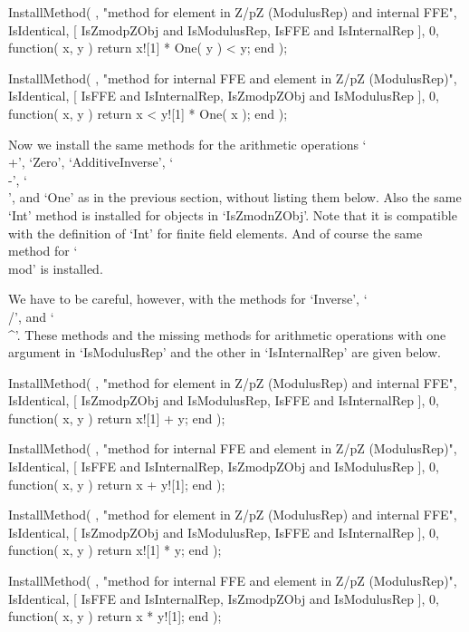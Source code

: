     InstallMethod( \<,
        "method for element in Z/pZ (ModulusRep) and internal FFE",
        IsIdentical,
        [ IsZmodpZObj and IsModulusRep, IsFFE and IsInternalRep ], 0,
        function( x, y )
        return x![1] * One( y ) < y;
        end );

    InstallMethod( \<,
        "method for internal FFE and element in Z/pZ (ModulusRep)",
        IsIdentical,
        [ IsFFE and IsInternalRep, IsZmodpZObj and IsModulusRep ], 0,
        function( x, y )
        return x < y![1] * One( x );
        end );
\endtt

Now we install the same methods for the arithmetic operations
`\\+', `Zero', `AdditiveInverse', `\\-', `\\\*', and `One'
as in the previous section, without listing them below.
Also the same `Int' method is installed for objects in `IsZmodnZObj'.
Note that it is compatible with the definition of `Int' for finite
field elements.
And of course the same method for `\\mod' is installed.

We have to be careful, however, with the methods for `Inverse', `\\/',
and `\\^'.
These methods and the missing methods for arithmetic operations with
one argument in `IsModulusRep' and the other in `IsInternalRep'
are given below.

\begintt
    InstallMethod( \+,
        "method for element in Z/pZ (ModulusRep) and internal FFE",
        IsIdentical,
        [ IsZmodpZObj and IsModulusRep, IsFFE and IsInternalRep ], 0,
        function( x, y ) return x![1] + y; end );

    InstallMethod( \+,
        "method for internal FFE and element in Z/pZ (ModulusRep)",
        IsIdentical,
        [ IsFFE and IsInternalRep, IsZmodpZObj and IsModulusRep ], 0,
        function( x, y ) return x + y![1]; end );

    InstallMethod( \*,
        "method for element in Z/pZ (ModulusRep) and internal FFE",
        IsIdentical,
        [ IsZmodpZObj and IsModulusRep, IsFFE and IsInternalRep ], 0,
        function( x, y ) return x![1] * y; end );

    InstallMethod( \*,
        "method for internal FFE and element in Z/pZ (ModulusRep)",
        IsIdentical,
        [ IsFFE and IsInternalRep, IsZmodpZObj and IsModulusRep ], 0,
        function( x, y ) return x * y![1]; end );

